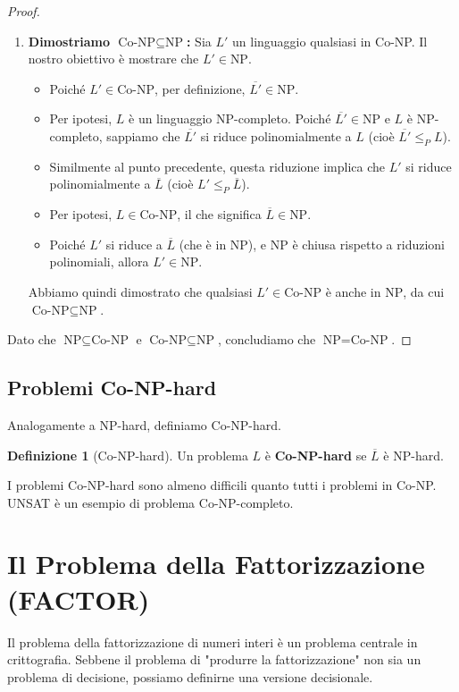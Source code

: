 \documentclass[a4paper]{article}
\theoremstyle{definition} %
\newtheorem{definition}{Definizione}
\begin{document}
\begin{proof}
\begin{enumerate}
    \item \textbf{Dimostriamo $\text{Co-NP} \subseteq \text{NP}$:}
    Sia $L'$ un linguaggio qualsiasi in Co-NP. Il nostro obiettivo è mostrare che $L' \in \text{NP}$.
    \begin{itemize}
        \item Poiché $L' \in \text{Co-NP}$, per definizione, $\overline{L'} \in \text{NP}$.
        \item Per ipotesi, $L$ è un linguaggio NP-completo. Poiché $\overline{L'} \in \text{NP}$ e $L$ è NP-completo, sappiamo che $\overline{L'}$ si riduce polinomialmente a $L$ (cioè $\overline{L'} \le_P L$).
        \item Similmente al punto precedente, questa riduzione implica che $L'$ si riduce polinomialmente a $\overline{L}$ (cioè $L' \le_P \overline{L}$).
        \item Per ipotesi, $L \in \text{Co-NP}$, il che significa $\overline{L} \in \text{NP}$.
        \item Poiché $L'$ si riduce a $\overline{L}$ (che è in NP), e NP è chiusa rispetto a riduzioni polinomiali, allora $L' \in \text{NP}$.
    \end{itemize}
    Abbiamo quindi dimostrato che qualsiasi $L' \in \text{Co-NP}$ è anche in $\text{NP}$, da cui $\text{Co-NP} \subseteq \text{NP}$.
\end{enumerate}
Dato che $\text{NP} \subseteq \text{Co-NP}$ e $\text{Co-NP} \subseteq \text{NP}$, concludiamo che $\text{NP} = \text{Co-NP}$.
\end{proof}

\subsection{Problemi Co-NP-hard}
Analogamente a NP-hard, definiamo Co-NP-hard.
\begin{definition}[Co-NP-hard]
Un problema $L$ è \textbf{Co-NP-hard} se $\overline{L}$ è NP-hard.
\end{definition}
I problemi Co-NP-hard sono almeno difficili quanto tutti i problemi in Co-NP. UNSAT è un esempio di problema Co-NP-completo.

\section{Il Problema della Fattorizzazione (FACTOR)}

Il problema della fattorizzazione di numeri interi è un problema centrale in crittografia. Sebbene il problema di "produrre la fattorizzazione" non sia un problema di decisione, possiamo definirne una versione decisionale.
\end{document}
